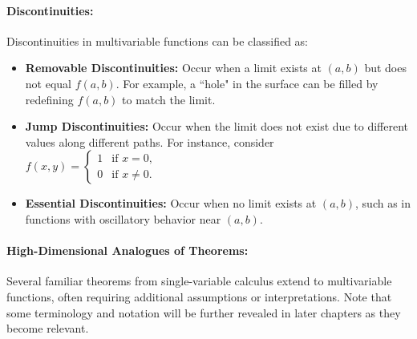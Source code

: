 \paragraph{Discontinuities:}
Discontinuities in multivariable functions can be classified as:
\begin{itemize}
    \item \textbf{Removable Discontinuities:} Occur when a limit exists at \( (a, b) \) but does not equal \( f(a, b) \). For example, a ``hole" in the surface can be filled by redefining \( f(a, b) \) to match the limit.
    \item \textbf{Jump Discontinuities:} Occur when the limit does not exist due to different values along different paths. For instance, consider \( f(x, y) = \begin{cases} 
    1 & \text{if } x = 0, \\
    0 & \text{if } x \neq 0.
    \end{cases} \)
    \item \textbf{Essential Discontinuities:} Occur when no limit exists at \( (a, b) \), such as in functions with oscillatory behavior near \( (a, b) \).
\end{itemize}

\paragraph{High-Dimensional Analogues of Theorems:} 
Several familiar theorems from single-variable calculus extend to multivariable functions, often requiring additional assumptions or interpretations. Note that some terminology and notation will be further revealed in later chapters as they become relevant.

